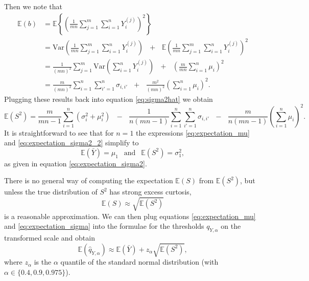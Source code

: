 \documentclass{article}
\begin{document}
Then we note that
\begin{align*}
\mathbb{E}(b) & = \mathbb{E}\left\{\left(\frac{1}{mn} \sum_{j = 1}^m \sum_{i = 1}^n Y_i^{(j)} \right)^2\right\}\\
& = \text{Var}\left( \frac{1}{mn} \sum_{j = 1}^m \sum_{i = 1}^n Y_i^{(j)} \right) \ \ \ + \ \ \ \mathbb{E}\left(\frac{1}{mn}  \sum_{j = 1}^m \sum_{i = 1}^n Y_i^{(j)} \right)^2\\
& = \frac{1}{(mn)^2}\sum_{j = 1}^m \text{Var}\left(\sum_{i = 1}^n Y_i^{(j)} \right) \ \ \ + \ \ \ \left(\frac{m}{mn} \sum_{i = 1}^n \mu_i\right)^2\\
& = \frac{m}{(mn)^2} \sum_{i = 1}^n \sum_{i' = 1}^n \sigma_{i,i'} \ \ \ + \ \ \ \frac{m^2}{(mn)^2}\left(\sum_{i = 1}^n \mu_i\right)^2.
\end{align*}
Plugging these results back into equation \eqref{eq:sigma2hat} we obtain
\begin{equation}
\mathbb{E}(S^2) = \frac{m}{mn - 1} \sum_{i = 1}^n (\sigma_{i}^2 + \mu_i^2) \ \ \ - \ \ \ \frac{1}{n(mn - 1)} \sum_{i = 1}^n \sum_{i' = 1}^n \sigma_{i,i'} \ \ \ - \ \ \ \frac{m}{n(mn - 1)}\left(\sum_{i = 1}^n \mu_i\right)^2.
\label{eq:expectation_sigma2_2}
\end{equation}
It is straightforward to see that for $n = 1$ the expressions \eqref{eq:expectation_mu} and \eqref{eq:expectation_sigma2_2} simplify to
$$
\mathbb{E}(\bar{Y}) = \mu_1 \ \ \text{ and } \ \ \mathbb{E}(S^2) = \sigma^2_1,
$$
as given in equation \eqref{eq:expectation_sigma2}.

There is no general way of computing the expectation $\mathbb{E}(S)$ from $\mathbb{E}(S^2)$, but unless the true distribution of  $S^2$ has strong excess curtosis,
\begin{equation}
\mathbb{E}(S) \approx \sqrt{\mathbb{E}(S^2)}
\label{eq:expectation_sigma}
\end{equation}
is a reasonable approximation. We can then plug equations \eqref{eq:expectation_mu} and \eqref{eq:expectation_sigma} into the formulae for the thresholds $q_{Y, \alpha}$ on the transformed scale and obtain
$$
\mathbb{E}(\hat{q}_{Y, \alpha}) \approx \mathbb{E}(\bar{Y}) + z_\alpha \sqrt{\mathbb{E}(S^2)},
$$
where $z_\alpha$ is the $\alpha$ quantile of the standard normal distribution (with $\alpha \in \{0.4, 0.9, 0.975\}$).
\end{document}
